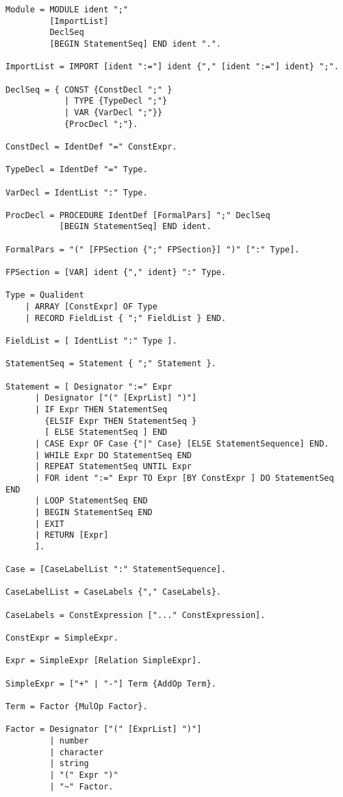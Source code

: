 \documentclass[12pt]{article}
\begin{document}
{\scriptsize
\begin{lstlisting}[style=EBNF]
Module = MODULE ident ";" 
         [ImportList] 
         DeclSeq 
         [BEGIN StatementSeq] END ident ".".

ImportList = IMPORT [ident ":="] ident {"," [ident ":="] ident} ";".

DeclSeq = { CONST {ConstDecl ";" } 
            | TYPE {TypeDecl ";"} 
            | VAR {VarDecl ";"}} 
            {ProcDecl ";"}.

ConstDecl = IdentDef "=" ConstExpr.

TypeDecl = IdentDef "=" Type.

VarDecl = IdentList ":" Type.

ProcDecl = PROCEDURE IdentDef [FormalPars] ";" DeclSeq 
           [BEGIN StatementSeq] END ident.

FormalPars = "(" [FPSection {";" FPSection}] ")" [":" Type].

FPSection = [VAR] ident {"," ident} ":" Type.

Type = Qualident
    | ARRAY [ConstExpr] OF Type
    | RECORD FieldList { ";" FieldList } END.

FieldList = [ IdentList ":" Type ].
    
StatementSeq = Statement { ";" Statement }.

Statement = [ Designator ":=" Expr
      | Designator ["(" [ExprList] ")"]
      | IF Expr THEN StatementSeq 
        {ELSIF Expr THEN StatementSeq } 
        [ ELSE StatementSeq ] END
      | CASE Expr OF Case {"|" Case} [ELSE StatementSequence] END. 
      | WHILE Expr DO StatementSeq END
      | REPEAT StatementSeq UNTIL Expr
      | FOR ident ":=" Expr TO Expr [BY ConstExpr ] DO StatementSeq END
      | LOOP StatementSeq END
      | BEGIN StatementSeq END
      | EXIT
      | RETURN [Expr] 
      ].

Case = [CaseLabelList ":" StatementSequence].

CaseLabelList = CaseLabels {"," CaseLabels}.

CaseLabels = ConstExpression ["..." ConstExpression].

ConstExpr = SimpleExpr.

Expr = SimpleExpr [Relation SimpleExpr].

SimpleExpr = ["+" | "-"] Term {AddOp Term}.

Term = Factor {MulOp Factor}.

Factor = Designator ["(" [ExprList] ")"] 
         | number 
         | character
         | string
         | "(" Expr ")" 
         | "~" Factor.


\end{lstlisting}}
\end{document}
